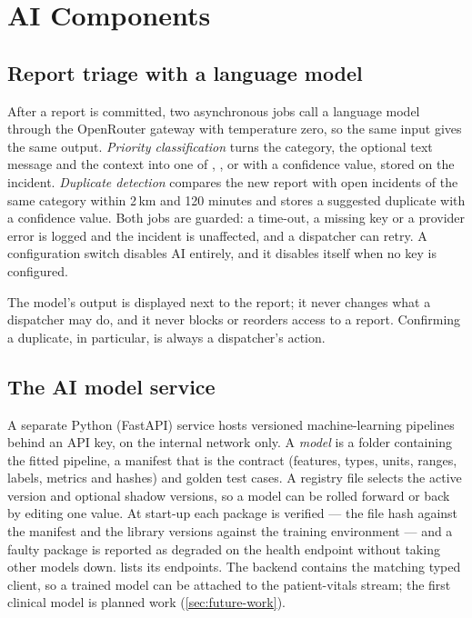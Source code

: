 \section{AI Components}\label{sec:ai-components}

\subsection{Report triage with a language model}
After a report is committed, two asynchronous jobs call a language model through the OpenRouter gateway with
temperature zero, so the same input gives the same output. \emph{Priority classification} turns the category, the
optional text message and the context into one of , ,  or  with a
confidence value, stored on the incident. \emph{Duplicate detection} compares the new report with open incidents of the
same category within 2\,km and 120 minutes and stores a suggested duplicate with a confidence value. Both jobs are
guarded: a time-out, a missing key or a provider error is logged and the incident is unaffected, and a dispatcher can
retry. A configuration switch disables AI entirely, and it disables itself when no key is configured.

\begin{designnote}
The model's output is displayed next to the report; it never changes what a dispatcher may do, and it never blocks
or reorders access to a report. Confirming a duplicate, in particular, is always a dispatcher's action.
\end{designnote}

\subsection{The AI model service}
A separate Python (FastAPI) service hosts versioned machine-learning pipelines behind an API key, on the internal
network only. A \emph{model} is a folder containing the fitted pipeline, a manifest that is the contract (features,
types, units, ranges, labels, metrics and hashes) and golden test cases. A registry file selects the active version and
optional shadow versions, so a model can be rolled forward or back by editing one value. At start-up each package is
verified --- the file hash against the manifest and the library versions against the training environment --- and a
faulty package is reported as degraded on the health endpoint without taking other models down.
 lists its endpoints. The backend contains the matching typed client, so a trained model can be
attached to the patient-vitals stream; the first clinical model is planned work (\cref{sec:future-work}).

